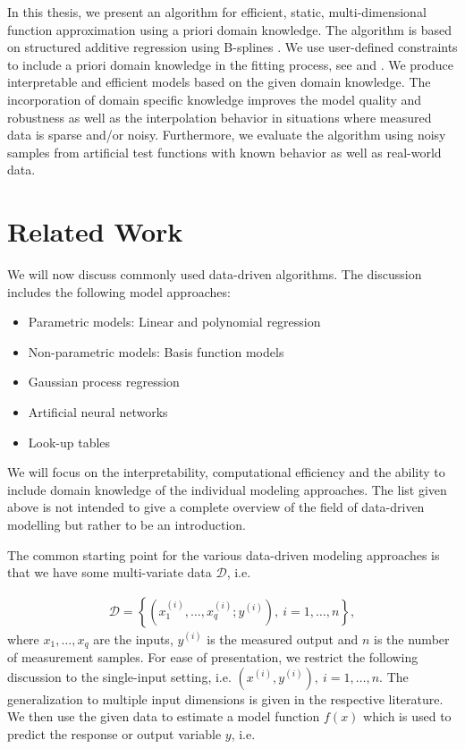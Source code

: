 In this thesis, we present an algorithm for efficient, static, multi-dimensional function approximation using a priori domain knowledge. The algorithm is based on structured additive regression using B-splines \cite{fahrmeir2007regression}. We use user-defined constraints to include a priori domain knowledge in the fitting process, see \cite{hofner2011monotonicity} and \cite{bollaerts2006simple}. We produce interpretable and efficient models based on the given domain knowledge. The incorporation of domain specific knowledge improves the model quality and robustness as well as the interpolation behavior in situations where measured data is sparse and/or noisy. Furthermore, we evaluate the algorithm using noisy samples from artificial test functions with known behavior as well as real-world data.
\section{Related Work}

We will now discuss commonly used data-driven algorithms. The discussion includes the following model approaches:

\begin{itemize}
	\item Parametric models: Linear and polynomial regression
	\item Non-parametric models: Basis function models
	\item Gaussian process regression
	\item Artificial neural networks
	\item Look-up tables
\end{itemize}
%
We will focus on the interpretability, computational efficiency and the ability to include domain knowledge of the individual modeling approaches. The list given above is not intended to give a complete overview of the field of data-driven modelling but rather to be an introduction.

The common starting point for the various data-driven modeling approaches is that we have some multi-variate data $\mathcal{D}$, i.e.

\begin{align}
	\mathcal{D} = \left\{ (x_1^{(i)}, \dots, x_q^{(i)}; y^{(i)} ), \ i = 1, \dots, n\right\},
\end{align} 
%
where $x_1, \dots, x_q$ are the inputs, $y^{(i)}$ is the measured output and $n$ is the number of measurement samples. For ease of presentation, we restrict the following discussion to the single-input setting, i.e. $(x^{(i)}, y^{(i)}), \ i=1, \dots, n$. The generalization to multiple input dimensions is given in the respective literature. We then use the given data to estimate a model function $f(x)$  which is used to predict the response or output variable $y$, i.e.

